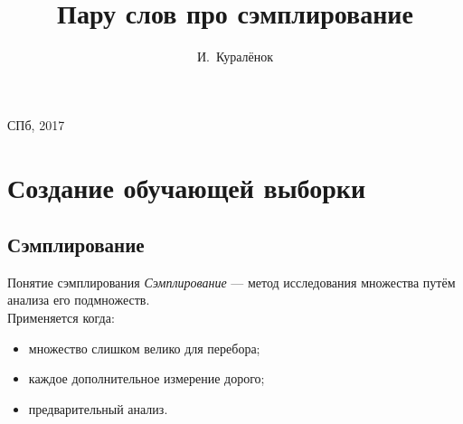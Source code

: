 \documentclass[14pt, fleqn, xcolor={dvipsnames, table}]{beamer}
\title{Пару слов про сэмплирование\\\small{}}
\author[]{\small{%
И.~Куралёнок}}
\date{}
\begin{document}
\begin{frame}
\maketitle
\small
\begin{center}
\vspace{-60pt}
\vspace{80pt}
\footnotesize СПб, 2017
\end{center}
\end{frame}


\section{Создание обучающей выборки}

\subsection{Сэмплирование}
\begin{frame}{Понятие сэмплирования}
\textit{Сэмплирование} --- метод исследования множества путём анализа его подмножеств. \\
Применяется когда:
\begin{itemize}
   \item множество слишком велико для перебора;
   \item каждое дополнительное измерение дорого;
   \item предварительный анализ.
\end{itemize}
\end{frame}
\end{document}
